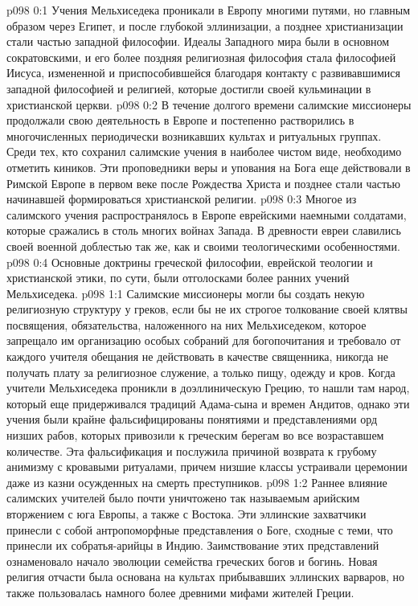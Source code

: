 \vs p098 0:1 Учения Мельхиседека проникали в Европу многими путями, но главным образом через Египет, и после глубокой эллинизации, а позднее христианизации стали частью западной философии. Идеалы Западного мира были в основном сократовскими, и его более поздняя религиозная философия стала философией Иисуса, измененной и приспособившейся благодаря контакту с развивавшимися западной философией и религией, которые достигли своей кульминации в христианской церкви.
\vs p098 0:2 В течение долгого времени салимские миссионеры продолжали свою деятельность в Европе и постепенно растворились в многочисленных периодически возникавших культах и ритуальных группах. Среди тех, кто сохранил салимские учения в наиболее чистом виде, необходимо отметить киников. Эти проповедники веры и упования на Бога еще действовали в Римской Европе в первом веке после Рождества Христа и позднее стали частью начинавшей формироваться христианской религии.
\vs p098 0:3 Многое из салимского учения распространялось в Европе еврейскими наемными солдатами, которые сражались в столь многих войнах Запада. В древности евреи славились своей военной доблестью так же, как и своими теологическими особенностями.
\vs p098 0:4 Основные доктрины греческой философии, еврейской теологии и христианской этики, по сути, были отголосками более ранних учений Мельхиседека.
\vs p098 1:1 Салимские миссионеры могли бы создать некую религиозную структуру у греков, если бы не их строгое толкование своей клятвы посвящения, обязательства, наложенного на них Мельхиседеком, которое запрещало им организацию особых собраний для богопочитания и требовало от каждого учителя обещания не действовать в качестве священника, никогда не получать плату за религиозное служение, а только пищу, одежду и кров. Когда учители Мельхиседека проникли в доэллиническую Грецию, то нашли там народ, который еще придерживался традиций Адама\hyp{}сына и времен Андитов, однако эти учения были крайне фальсифицированы понятиями и представлениями орд низших рабов, которых привозили к греческим берегам во все возраставшем количестве. Эта фальсификация и послужила причиной возврата к грубому анимизму с кровавыми ритуалами, причем низшие классы устраивали церемонии даже из казни осужденных на смерть преступников.
\vs p098 1:2 Раннее влияние салимских учителей было почти уничтожено так называемым арийским вторжением с юга Европы, а также с Востока. Эти эллинские захватчики принесли с собой антропоморфные представления о Боге, сходные с теми, что принесли их собратья\hyp{}арийцы в Индию. Заимствование этих представлений ознаменовало начало эволюции семейства греческих богов и богинь. Новая религия отчасти была основана на культах прибывавших эллинских варваров, но также пользовалась намного более древними мифами жителей Греции.

